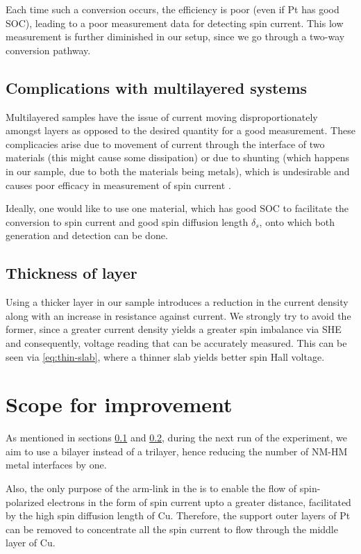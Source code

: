 Each time such a conversion occurs, the efficiency is poor (even if Pt has good SOC), leading to a poor measurement data for detecting spin current. This low measurement is further diminished in our setup, since we go through a two-way conversion pathway.

\subsection{Complications with multilayered systems}

\label{subsec:multilayer}

Multilayered samples have the issue of current moving disproportionately amongst layers as opposed to the desired quantity for a good measurement.
These complicacies arise due to movement of current through the interface of two materials (this might cause some dissipation) or due to shunting (which happens in our sample, due to both the materials being metals), which is undesirable and causes poor efficacy in measurement of spin current \cite{maekawa2017spin}.

Ideally, one would like to use one material, which has good SOC to facilitate the conversion to spin current and good spin diffusion length \( \delta_s \), onto which both generation and detection can be done.

\subsection{Thickness of layer}

\label{subsec:thickness}

Using a thicker layer in our sample introduces a reduction in the current density along with an increase in resistance against current.
We strongly try to avoid the former, since a greater current density yields a greater spin imbalance via SHE and consequently, voltage reading that can be accurately measured.
This can be seen via \cref{eq:thin-slab}, where a thinner slab yields better spin Hall voltage.

\section{Scope for improvement}

As mentioned in sections \ref{subsec:multilayer} and \ref{subsec:thickness}, during the next run of the experiment, we aim to use a bilayer instead of a trilayer, hence reducing the number of NM-HM metal interfaces by one.

Also, the only purpose of the arm-link in the \Hst is to enable the flow of spin-polarized electrons in the form of spin current upto a greater distance, facilitated by the high spin diffusion length of Cu.
Therefore, the support outer layers of Pt can be removed to concentrate all the spin current to flow through the middle layer of Cu.
